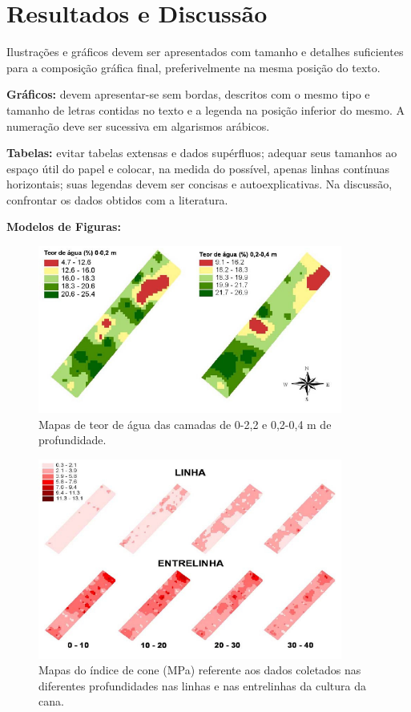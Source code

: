\section*{Resultados e Discussão}

Ilustrações e gráficos devem ser apresentados com tamanho e detalhes suficientes para a composição gráfica final, preferivelmente na mesma posição do texto.

\textbf{Gráficos:} devem apresentar-se sem bordas, descritos com o mesmo tipo e tamanho de letras contidas no texto e a legenda na posição inferior do mesmo. A numeração deve ser sucessiva em algarismos arábicos.

\textbf{Tabelas:} evitar tabelas extensas e dados supérfluos; adequar seus tamanhos ao espaço útil do papel e colocar, na medida do possível, apenas linhas contínuas horizontais; suas legendas devem ser concisas e autoexplicativas. Na discussão, confrontar os dados obtidos com a literatura.
\vspace{0.5cm}

\noindent\textbf{Modelos de Figuras:}


\begin{figure}[ht]
\centering
\includegraphics[width=10cm,angle=0]{grafico_1}
\caption{Mapas de teor de água das camadas de 0-2,2 e 0,2-0,4 m de profundidade.}
\label{fig:nome_referencia_figura1}
\end{figure}

\begin{figure}[ht]
\centering
\includegraphics[width=10cm,angle=0]{grafico_2.png}
\caption{Mapas do índice de cone (MPa) referente aos dados coletados nas diferentes profundidades nas linhas e nas entrelinhas da cultura da cana.}
\label{fig:nome_referencia_figura2}
\end{figure}

